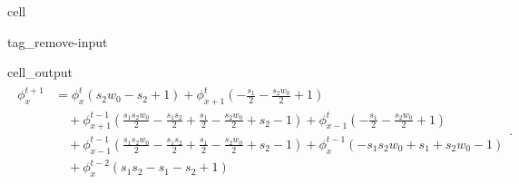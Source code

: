 \documentclass[letterpaper,10pt,english,openany,oneside]{jupyterBook}
\begin{document}
\begin{sphinxuseclass}{cell}
\begin{sphinxuseclass}{tag_remove-input}\begin{sphinxVerbatimOutput}

\begin{sphinxuseclass}{cell_output}\begin{equation*}
\begin{split}\displaystyle \begin{aligned}\phi_{x}^{t+1} &= \phi^{t}_{x} \left(s_{2} w_{0} - s_{2} + 1\right) + \phi_{x+1}^t \left(- \frac{s_{1}}{2} - \frac{s_{2} w_{0}}{2} + 1\right) \\ &\quad + \phi_{x+1}^{t-1} \left(\frac{s_{1} s_{2} w_{0}}{2} - \frac{s_{1} s_{2}}{2} + \frac{s_{1}}{2} - \frac{s_{2} w_{0}}{2} + s_{2} - 1\right) + \phi_{x-1}^t \left(- \frac{s_{1}}{2} - \frac{s_{2} w_{0}}{2} + 1\right) \\ &\quad + \phi_{x-1}^{t-1} \left(\frac{s_{1} s_{2} w_{0}}{2} - \frac{s_{1} s_{2}}{2} + \frac{s_{1}}{2} - \frac{s_{2} w_{0}}{2} + s_{2} - 1\right) + \phi_{x}^{t-1} \left(- s_{1} s_{2} w_{0} + s_{1} + s_{2} w_{0} - 1\right) \\ &\quad + \phi_{x}^{t-2} \left(s_{1} s_{2} - s_{1} - s_{2} + 1\right)\end{aligned}.\end{split}
\end{equation*}
\end{sphinxuseclass}\end{sphinxVerbatimOutput}

\end{sphinxuseclass}
\end{sphinxuseclass}
\end{document}
